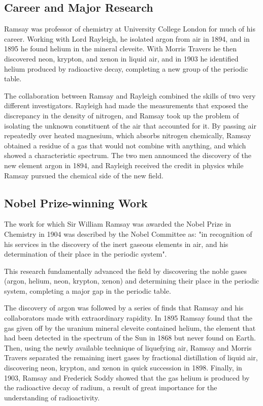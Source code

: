 \subsection*{Career and Major Research}

Ramsay was professor of chemistry at University College London for much of his career. Working with Lord Rayleigh, he isolated argon from air in 1894, and in 1895 he found helium in the mineral cleveite. With Morris Travers he then discovered neon, krypton, and xenon in liquid air, and in 1903 he identified helium produced by radioactive decay, completing a new group of the periodic table.

The collaboration between Ramsay and Rayleigh combined the skills of two very different investigators. Rayleigh had made the measurements that exposed the discrepancy in the density of nitrogen, and Ramsay took up the problem of isolating the unknown constituent of the air that accounted for it. By passing air repeatedly over heated magnesium, which absorbs nitrogen chemically, Ramsay obtained a residue of a gas that would not combine with anything, and which showed a characteristic spectrum. The two men announced the discovery of the new element argon in 1894, and Rayleigh received the credit in physics while Ramsay pursued the chemical side of the new field.

\subsection*{Nobel Prize-winning Work}

The work for which Sir William Ramsay was awarded the Nobel Prize in Chemistry in 1904 was described by the Nobel Committee as: "in recognition of his services in the discovery of the inert gaseous elements in air, and his determination of their place in the periodic system".

This research fundamentally advanced the field by discovering the noble gases (argon, helium, neon, krypton, xenon) and determining their place in the periodic system, completing a major gap in the periodic table.

The discovery of argon was followed by a series of finds that Ramsay and his collaborators made with extraordinary rapidity. In 1895 Ramsay found that the gas given off by the uranium mineral cleveite contained helium, the element that had been detected in the spectrum of the Sun in 1868 but never found on Earth. Then, using the newly available technique of liquefying air, Ramsay and Morris Travers separated the remaining inert gases by fractional distillation of liquid air, discovering neon, krypton, and xenon in quick succession in 1898. Finally, in 1903, Ramsay and Frederick Soddy showed that the gas helium is produced by the radioactive decay of radium, a result of great importance for the understanding of radioactivity.

